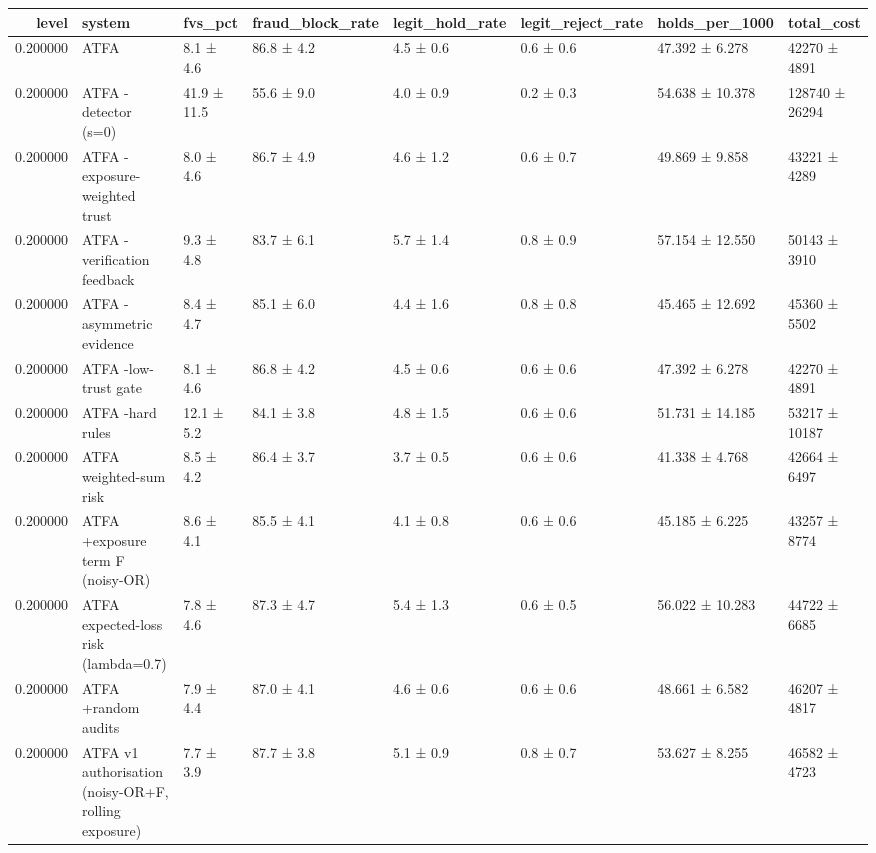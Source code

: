 \begin{tabular}{rlllllll}
\toprule
level & system & fvs\_pct & fraud\_block\_rate & legit\_hold\_rate & legit\_reject\_rate & holds\_per\_1000 & total\_cost \\
\midrule
0.200000 & ATFA & 8.1 ± 4.6 & 86.8 ± 4.2 & 4.5 ± 0.6 & 0.6 ± 0.6 & 47.392 ± 6.278 & 42270 ± 4891 \\
0.200000 & ATFA -detector (s=0) & 41.9 ± 11.5 & 55.6 ± 9.0 & 4.0 ± 0.9 & 0.2 ± 0.3 & 54.638 ± 10.378 & 128740 ± 26294 \\
0.200000 & ATFA -exposure-weighted trust & 8.0 ± 4.6 & 86.7 ± 4.9 & 4.6 ± 1.2 & 0.6 ± 0.7 & 49.869 ± 9.858 & 43221 ± 4289 \\
0.200000 & ATFA -verification feedback & 9.3 ± 4.8 & 83.7 ± 6.1 & 5.7 ± 1.4 & 0.8 ± 0.9 & 57.154 ± 12.550 & 50143 ± 3910 \\
0.200000 & ATFA -asymmetric evidence & 8.4 ± 4.7 & 85.1 ± 6.0 & 4.4 ± 1.6 & 0.8 ± 0.8 & 45.465 ± 12.692 & 45360 ± 5502 \\
0.200000 & ATFA -low-trust gate & 8.1 ± 4.6 & 86.8 ± 4.2 & 4.5 ± 0.6 & 0.6 ± 0.6 & 47.392 ± 6.278 & 42270 ± 4891 \\
0.200000 & ATFA -hard rules & 12.1 ± 5.2 & 84.1 ± 3.8 & 4.8 ± 1.5 & 0.6 ± 0.6 & 51.731 ± 14.185 & 53217 ± 10187 \\
0.200000 & ATFA weighted-sum risk & 8.5 ± 4.2 & 86.4 ± 3.7 & 3.7 ± 0.5 & 0.6 ± 0.6 & 41.338 ± 4.768 & 42664 ± 6497 \\
0.200000 & ATFA +exposure term F (noisy-OR) & 8.6 ± 4.1 & 85.5 ± 4.1 & 4.1 ± 0.8 & 0.6 ± 0.6 & 45.185 ± 6.225 & 43257 ± 8774 \\
0.200000 & ATFA expected-loss risk (lambda=0.7) & 7.8 ± 4.6 & 87.3 ± 4.7 & 5.4 ± 1.3 & 0.6 ± 0.5 & 56.022 ± 10.283 & 44722 ± 6685 \\
0.200000 & ATFA +random audits & 7.9 ± 4.4 & 87.0 ± 4.1 & 4.6 ± 0.6 & 0.6 ± 0.6 & 48.661 ± 6.582 & 46207 ± 4817 \\
0.200000 & ATFA v1 authorisation (noisy-OR+F, rolling exposure) & 7.7 ± 3.9 & 87.7 ± 3.8 & 5.1 ± 0.9 & 0.8 ± 0.7 & 53.627 ± 8.255 & 46582 ± 4723 \\
\bottomrule
\end{tabular}
